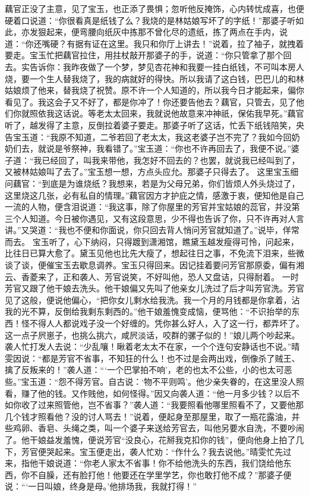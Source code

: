 \documentclass[12pt,oneside]{book}
\begin{document}
藕官正没了主意，见了宝玉，也正添了畏惧；忽听他反掩饰，心内转忧成喜，也便硬着口说道：“你很看真是纸钱了么？我烧的是林姑娘写坏了的字纸！”那婆子听如此，亦发狠起来，便弯腰向纸灰中拣那不曾化尽的遗纸，拣了两点在手内，说道：“你还嘴硬？有据有证在这里。我只和你厅上讲去！”说着，拉了袖子，就拽着要走。宝玉忙把藕官拉住，用拄杖敲开那婆子的手，说道：“你只管拿了那个回去。实告诉你：我昨夜做了一个梦，梦见杏花神和我要一挂白纸钱，不可叫本房人烧，要一个生人替我烧了，我的病就好的得快。所以我请了这白钱，巴巴儿的和林姑娘烦了他来，替我烧了祝赞。原不许一个人知道的，所以我今日才能起来，偏你看见了。我这会子又不好了，都是你冲了！你还要告他去？藕官，只管去，见了他们你就照依我这话说。等老太太回来，我就说他故意来冲神祇，保佑我早死。”藕官听了，越发得了主意，反倒拉着婆子要走。那婆子听了这话，忙丢下纸钱陪笑，央告宝玉道：“我原不知道，二爷若回了老太太，我这老婆子岂不完了？我如今回奶奶们去，就说是爷祭神，我看错了。”宝玉道：“你也不许再回去了，我便不说。”婆子道：“我已经回了，叫我来带他，我怎好不回去的？也罢，就说我已经叫到了，又被林姑娘叫了去了。”宝玉想一想，方点头应允。那婆子只得去了。
这里宝玉细问藕官：“到底是为谁烧纸？我想来，若是为父母兄弟，你们皆烦人外头烧过了，这里烧这几张，必有私自的情理。”藕官因方才护庇之情，感激于衷，便知他是自己一流的人物，便含泪说道：“我这事，除了你屋里的芳官并宝姑娘的蕊官，并没第三个人知道。今日被你遇见，又有这段意思，少不得也告诉了你，只不许再对人言讲。”又哭道：“我也不便和你面说，你只回去背人悄问芳官就知道了。”说毕，佯常而去。
宝玉听了，心下纳闷，只得踱到潇湘馆，瞧黛玉越发瘦得可怜，问起来，比往日已算大愈了。黛玉见他也比先大瘦了，想起往日之事，不免流下泪来，些微谈了谈，便催宝玉去歇息调养。宝玉只得回来。因记挂着要问芳官那原委，偏有湘云、香菱来了，正和袭人、芳官说笑，不好叫他，恐人又盘诘，只得耐着。
一时芳官又跟了他干娘去洗头。他干娘偏又先叫了他亲女儿洗过了后才叫芳官洗。芳官见了这般，便说他偏心，“把你女儿剩水给我洗。我一个月的月钱都是你拿着，沾我的光不算，反倒给我剩东剩西的。”他干娘羞愧变成恼，便骂他：“不识抬举的东西！怪不得人人都说戏子没一个好缠的。凭你甚么好人，入了这一行，都弄坏了。这一点子屄崽子，也挑么挑六，咸屄淡话，咬群的骡子似的！”娘儿两个吵起来。
袭人忙打发人去说：“少乱嚷！瞅着老太太不在家，一个个连句安静话也不说。”晴雯因说：“都是芳官不省事，不知狂的什么！也不过是会两出戏，倒像杀了贼王、擒了反叛来的！”袭人道：“‘一个巴掌拍不响’，老的也太不公些，小的也太可恶些。”宝玉道：“怨不得芳官。自古说：‘物不平则鸣’。他少亲失眷的，在这里没人照看，赚了他的钱。又作贱他，如何怪得。”因又向袭人道：“他一月多少钱？以后不如你收了过来照管他，岂不省事？”袭人道：“我要照看他哪里照看不了，又要他那几个钱才照看他？没的讨人骂去！”说着，便起身至那屋里，取了一瓶花露油，并些鸡卵、香皂、头绳之类，叫一个婆子来送给芳官去，叫他另要水自洗，不要吵闹了。他干娘益发羞愧，便说芳官“没良心，花掰我克扣你的钱”，便向他身上拍了几下，芳官便哭起来。宝玉便走出，袭人忙劝：“作什么？我去说他。”晴雯忙先过来，指他干娘说道：“你老人家太不省事！你不给他洗头的东西，我们饶给他东西，你不自臊，还有脸打他！他要还在学里学艺，你也敢打他不成？”那婆子便说：“‘一日叫娘，终身是母。’他排场我，我就打得！”
\end{document}
